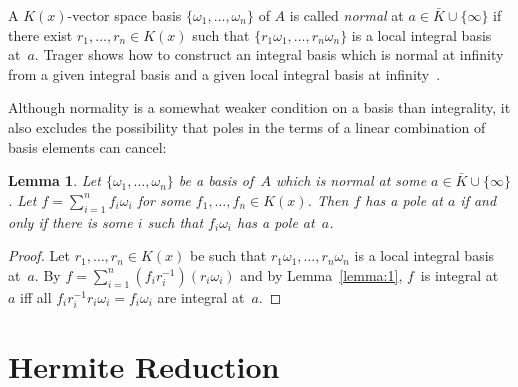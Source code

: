 \documentclass{sig-alternate}
\newtheorem{lemma}[theorem]{Lemma}
\begin{document}
A $K(x)$-vector space basis $\{\omega_1,\dots,\omega_n\}$ of $A$ is
called \emph{normal} at $a\in\bar K\cup\{\infty\}$ if there exist $r_1,\dots,r_n\in
K(x)$ such that $\{r_1\omega_1,\dots,r_n\omega_n\}$ is a local integral basis
at~$a$. Trager shows how to construct
an integral basis which is normal at infinity from a given integral basis and
a given local integral basis at infinity~\cite{trager84}.

Although normality is a somewhat weaker condition on a basis than integrality,
it also excludes the possibility that poles in the terms of a linear combination
of basis elements can cancel:

\begin{lemma}\label{lemma:3}
  Let $\{\omega_1,\dots,\omega_n\}$ be a basis of~$A$
  which is normal at some $a\in\bar K\cup\{\infty\}$.
  Let $f=\sum_{i=1}^n f_i\omega_i$ for some $f_1,\dots,f_n\in K(x)$.
  Then $f$ has a pole at $a$ if and only if
  there is some $i$ such that $f_i\omega_i$ has a pole at~$a$.
\end{lemma}
\begin{proof}
  Let $r_1,\dots,r_n\in K(x)$ be such that $r_1\omega_1,\dots,r_n\omega_n$ is a
  local integral basis at~$a$. By $f=\sum_{i=1}^n
  (f_ir_i^{-1})(r_i\omega_i)$ and by Lemma~\ref{lemma:1}, $f$~is integral at~$a$ iff all
  $f_ir_i^{-1}r_i\omega_i=f_i\omega_i$ are integral at~$a$.
\end{proof}

\section{Hermite Reduction}\label{sec:hermite}
\end{document}
